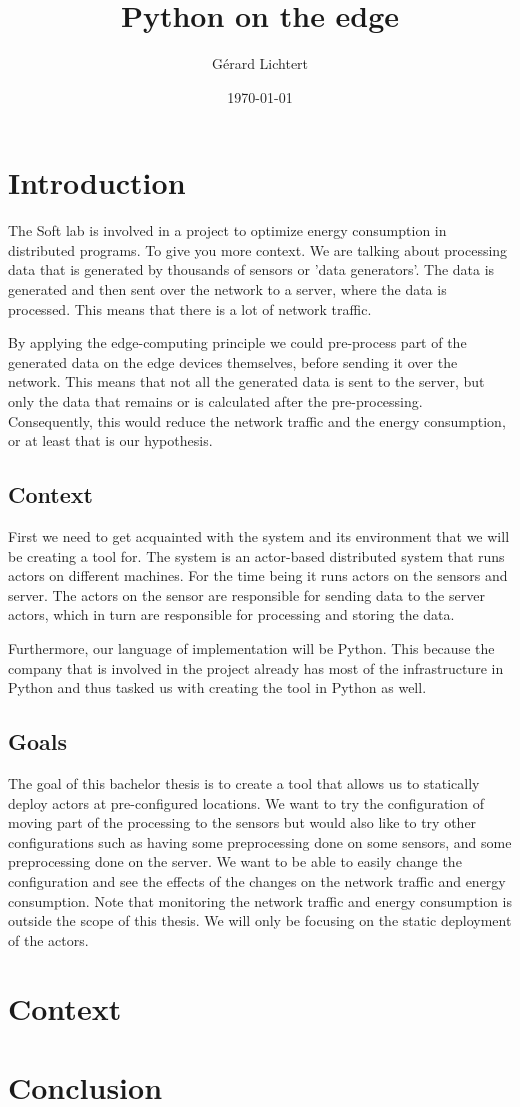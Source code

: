 \documentclass[a4paper]{article}
\title{Python on the edge}
\author{Gérard Lichtert}
\date{\today}
\begin{document}
\maketitle
\tableofcontents
\newpage
\raggedright{}


\section{Introduction}
The Soft lab is involved in a project to optimize energy consumption in distributed programs. To give you more context. We are talking about processing data that is generated by thousands of sensors or 'data generators'. The data is generated and then sent over the network to a server, where the data is processed. This means that there is a lot of network traffic.

By applying the edge-computing principle we could pre-process part of the generated data on the edge devices themselves, before sending it over the network. This means that not all the generated data is sent to the server, but only the data that remains or is calculated after the pre-processing. Consequently, this would reduce the network traffic and the energy consumption, or at least that is our hypothesis.
\subsection{Context}
First we need to get acquainted with the system and its environment that we will be creating a tool for. The system is an actor-based distributed system that runs actors on different machines. For the time being it runs actors on the sensors and server. The actors on the sensor are responsible for sending data to the server actors, which in turn are responsible for processing and storing the data.

Furthermore, our language of implementation will be Python. This because the company that is involved in the project already has most of the infrastructure in Python and thus tasked us with creating the tool in Python as well.

\subsection{Goals}
The goal of this bachelor thesis is to create a tool that allows us to statically deploy actors at pre-configured locations. We want to try the configuration of moving part of the processing to the sensors but would also like to try other configurations such as having some preprocessing done on some sensors, and some preprocessing done on the server. We want to be able to easily change the configuration and see the effects of the changes on the network traffic and energy consumption. Note that monitoring the network traffic and energy consumption is outside the scope of this thesis. We will only be focusing on the static deployment of the actors.
\section{Context}

\section{Conclusion}

\end{document}

